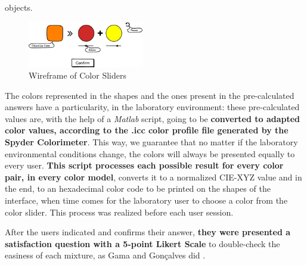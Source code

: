 objects.
%
\begin{figure}[htbp]
	\centering
  \includegraphics[width=0.45\textwidth]{images/sliders.png}
  \caption{Wireframe of Color Sliders}
  \label{fig:sliders}
\end{figure} \par
%
The colors represented in the shapes and the ones present in the pre-calculated answers have a particularity,
in the laboratory environment: these pre-calculated values are, with the help of a \emph{Matlab} script,
going to be \textbf{converted to adapted color values, according to the .icc color profile file generated by
the Spyder Colorimeter}. This way, we guarantee that no matter if the laboratory environmental conditions
change, the colors will always be presented equally to every user. \textbf{This script processes each possible
result for every color pair, in every color model}, converts it to a normalized CIE-XYZ value and in the end,
to an hexadecimal color code to be printed on the shapes of the interface, when time comes for the laboratory
user to choose a color from the color slider. This process was realized before each user session. \par
%
After the users indicated and confirms their answer, \textbf{they were presented a satisfaction question with
a 5-point Likert Scale} to double-check the easiness of each mixture, as Gama and Gonçalves did \cite{Gama20141}.
